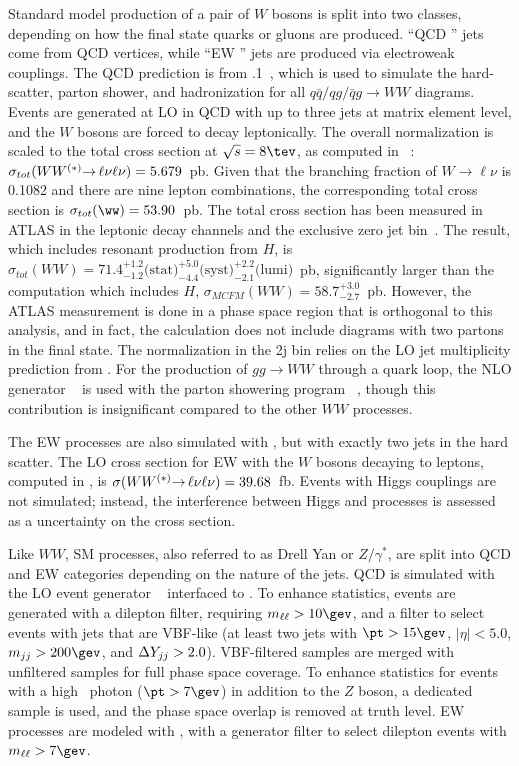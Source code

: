 Standard model production of a pair of $W$ bosons is split into two
classes, depending on how the final state quarks or gluons are
produced. ``QCD \ww'' jets come from QCD vertices, while ``EW \ww''
jets are produced via electroweak couplings. The QCD \ww prediction is from .1~\cite{bib:Gleisberg:2008ta}, which is used to
simulate the hard-scatter, parton shower, and hadronization for all
$q\bar{q}/qg/\bar{q}g\rightarrow{WW}$ diagrams. Events are generated
at LO in QCD with up to three jets at matrix element level, and the
$W$ bosons are forced to decay leptonically. The overall normalization is
scaled to the total \ww cross section at $\sqrts=8 \tev$, as computed
in \MCFM~\cite{bib:Campbell:2011bn}: $\sigma_{tot}(WW^{(\ast)}{\rightarrow\,}\ell\nu\ell\nu) = 5.679$~pb. Given that the branching
fraction of $W\rightarrow{\ell\nu}$ is 0.1082 and there are nine
lepton combinations, the corresponding total cross section is
$\sigma_{tot}(\ww) = 53.90$~pb. The total \ww cross section has been
measured in ATLAS in the \ww leptonic decay channels and the exclusive
zero jet bin~\cite{bib:ww_cross_section}. The result, which includes
resonant \ww production from $H$, is
$\sigma_{tot}(WW) = 71.4^{+1.2}_{-1.2} \textrm{(stat)} ^{+5.0}_{-4.4}
\textrm{(syst)}^{+2.2}_{-2.1}\textrm{(lumi)}$~pb, significantly larger
than the \MCFM computation which includes $H$, $\sigma_{MCFM}(WW) =
58.7^{+3.0}_{-2.7}$~pb. However, the ATLAS measurement is done in a
phase space region that is orthogonal to this analysis, and in fact,
the \MCFM calculation does not include diagrams with two partons in the final
state. The normalization in the 2j bin relies on the LO jet
multiplicity prediction from \SHERPA. For the production of
$gg\rightarrow{WW}$ through a quark loop, the NLO generator \GGTOWW~\cite{bib:Binoth:2006mf} is
used with the parton showering program
\HERWIG~\cite{bib:Corcella:2000bw}, though this contribution is
insignificant compared to the other $WW$ processes. 

The EW \ww processes are also simulated with \SHERPA, but with exactly two
jets in the hard scatter. The LO cross section for EW \ww with the
$W$ bosons decaying to leptons, computed in \SHERPA, is $\sigma(WW^{(\ast)}{\rightarrow\,}\ell\nu\ell\nu) =
39.68$~fb. Events with Higgs couplings are not simulated; instead, the
interference between Higgs and \ww processes is assessed as a
uncertainty on the cross section. 

Like $WW$, SM \zjets processes, also referred to as Drell Yan or
$Z/\gamma^\ast$, are split into QCD and EW categories
depending on the nature of the jets. QCD \zjets is simulated with the
LO event generator \ALPGEN~\cite{bib:Mangano:2002ea} interfaced to
\HERWIG. To enhance statistics, events are generated with a dilepton
filter, requiring $\mll>10 \gev$, and a filter to select events with jets that are VBF-like (at
least two jets with $\pt>15 \gev$, $|\eta| < 5.0$, $\mjj>200 \gev$,
and $\Delta Y_{jj}>2.0$). VBF-filtered samples are merged with unfiltered
samples for full phase space coverage. To enhance statistics for events with a
high \pt~photon ($\pt>7 \gev$) in addition to the $Z$ boson, a
dedicated \SHERPA sample is used, and the phase space overlap is removed at truth
level. EW \zjets processes are modeled with \SHERPA, with a generator
filter to select dilepton events with $\mll>7 \gev$. 

